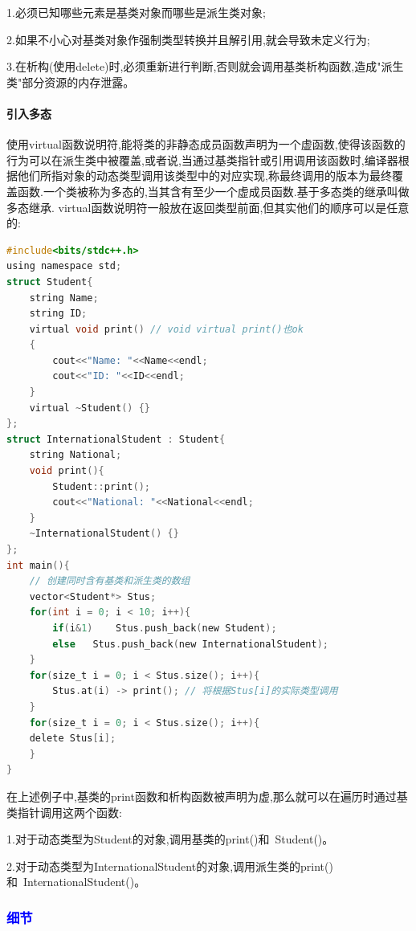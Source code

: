 \documentclass[UTF8]{ctexart}
\begin{document}
1.必须已知哪些元素是基类对象而哪些是派生类对象;

2.如果不小心对基类对象作强制类型转换并且解引用,就会导致未定义行为;

3.在析构(使用delete)时,必须重新进行判断,否则就会调用基类析构函数,造成"派生类"部分资源的内存泄露。

\paragraph{引入多态}
使用virtual函数说明符,能将类的非静态成员函数声明为一个虚函数,使得该函数的行为可以在派生类中被覆盖,或者说,当通过基类指针或引用调用该函数时,编译器根据他们所指对象的动态类型调用该类型中的对应实现,称最终调用的版本为最终覆盖函数.一个类被称为多态的,当其含有至少一个虚成员函数.基于多态类的继承叫做多态继承.
virtual函数说明符一般放在返回类型前面,但其实他们的顺序可以是任意的:
\begin{lstlisting}[language = C,basicstyle=\small\ttfamily]
#include<bits/stdc++.h>
using namespace std;
struct Student{    
    string Name;   
    string ID;
    virtual void print() // void virtual print()也ok    
    {        
        cout<<"Name: "<<Name<<endl;        
        cout<<"ID: "<<ID<<endl;    
    }    
    virtual ~Student() {}
};
struct InternationalStudent : Student{   
    string National;
    void print(){        
        Student::print();        
        cout<<"National: "<<National<<endl;    
    }    
    ~InternationalStudent() {}
};
int main(){    
    // 创建同时含有基类和派生类的数组    
    vector<Student*> Stus;     
    for(int i = 0; i < 10; i++){        
        if(i&1)    Stus.push_back(new Student);        
        else   Stus.push_back(new InternationalStudent);    
    }
    for(size_t i = 0; i < Stus.size(); i++){        
        Stus.at(i) -> print(); // 将根据Stus[i]的实际类型调用    
    }
    for(size_t i = 0; i < Stus.size(); i++){        
    delete Stus[i];    
    }
}
\end{lstlisting}

在上述例子中,基类的print函数和析构函数被声明为虚,那么就可以在遍历时通过基类指针调用这两个函数:

1.对于动态类型为Student的对象,调用基类的print()和~Student()。

2.对于动态类型为InternationalStudent的对象,调用派生类的print()和~InternationalStudent()。

\subsubsection{\textcolor{blue}{细节}}
\end{document}
